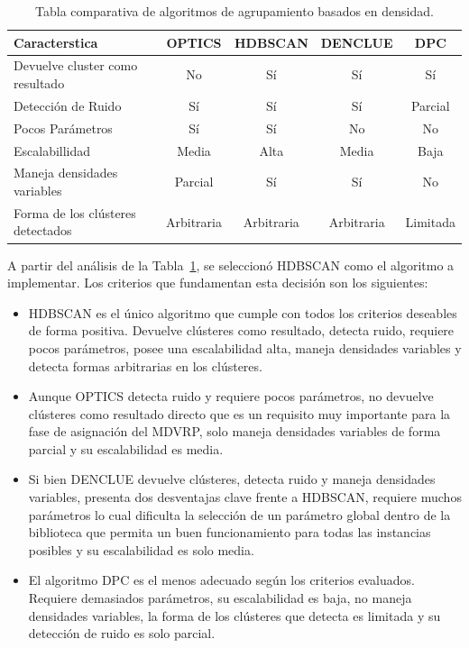 \clearpage
\begin{table}[htbp]
\centering
\caption{Tabla comparativa de algoritmos de agrupamiento basados en densidad.}
\label{tab:comparate}
 \begin{tabular}{@{}lcccc@{}}
\toprule
\textbf{Caracterstica} & \textbf{{OPTICS}} & \textbf{{HDBSCAN}} & \textbf{{DENCLUE}} & \textbf{{DPC}} \\
\midrule
Devuelve cluster como resultado & No    & Sí    & Sí    & Sí \\
Detección de Ruido & Sí    & Sí    & Sí    & Parcial \\
Pocos Parámetros & Sí    & Sí    & No    & No \\
Escalabillidad & Media    & Alta    & Media    & Baja \\
Maneja densidades variables & Parcial    & Sí    & Sí    & No \\
Forma de los clústeres detectados & Arbitraria & Arbitraria & Arbitraria & Limitada \\
\bottomrule
\end{tabular}%
\end{table}%

A partir del análisis de la Tabla~\ref{tab:comparate}, se seleccionó HDBSCAN como el algoritmo a implementar. Los criterios que fundamentan esta decisión son los siguientes:

\begin{itemize}
    \item HDBSCAN es el único algoritmo que cumple con todos los criterios deseables de forma positiva. Devuelve clústeres como resultado, detecta ruido, requiere pocos parámetros, posee una escalabilidad alta, maneja densidades variables y detecta formas arbitrarias en los clústeres.
    
    \item Aunque OPTICS detecta ruido y requiere pocos parámetros, no devuelve clústeres como resultado directo que es un requisito muy importante para la fase de asignación del MDVRP, solo maneja densidades variables de forma parcial y su escalabilidad es media.
    
    \item Si bien DENCLUE devuelve clústeres, detecta ruido y maneja densidades variables, presenta dos desventajas clave frente a HDBSCAN, requiere muchos parámetros lo cual dificulta la selección de un parámetro global dentro de la biblioteca que permita un buen funcionamiento para todas las instancias posibles y su escalabilidad es solo media.
    
    \item El algoritmo DPC es el menos adecuado según los criterios evaluados. Requiere demasiados parámetros, su escalabilidad es baja, no maneja densidades variables, la forma de los clústeres que detecta es limitada y su detección de ruido es solo parcial.
\end{itemize}

